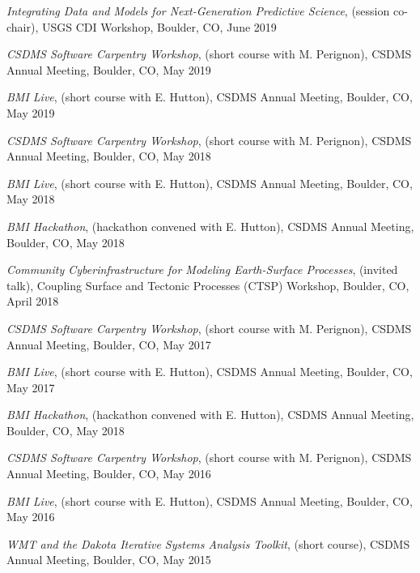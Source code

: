 \begin{enumerate}[{[}1{]}]
  \item \textit{Integrating Data and Models for Next-Generation
    Predictive Science}, (session co-chair), USGS CDI Workshop,
    Boulder, CO, June 2019

  \item \textit{CSDMS Software Carpentry Workshop}, (short course with
    M. Perignon), CSDMS Annual Meeting, Boulder, CO, May 2019

  \item \textit{BMI Live}, (short course with E. Hutton),
    CSDMS Annual Meeting, Boulder, CO, May 2019

  \item \textit{CSDMS Software Carpentry Workshop}, (short course with
    M. Perignon), CSDMS Annual Meeting, Boulder, CO, May 2018

  \item \textit{BMI Live}, (short course with E. Hutton),
    CSDMS Annual Meeting, Boulder, CO, May 2018

  \item \textit{BMI Hackathon}, (hackathon convened with E. Hutton),
    CSDMS Annual Meeting, Boulder, CO, May 2018

  \item \textit{Community Cyberinfrastructure for Modeling
    Earth-Surface Processes}, (invited talk), Coupling Surface and
    Tectonic Processes (CTSP) Workshop, Boulder, CO, April 2018

  \item \textit{CSDMS Software Carpentry Workshop}, (short course with
    M. Perignon), CSDMS Annual Meeting, Boulder, CO, May 2017

  \item \textit{BMI Live}, (short course with E. Hutton),
    CSDMS Annual Meeting, Boulder, CO, May 2017

  \item \textit{BMI Hackathon}, (hackathon convened with E. Hutton),
    CSDMS Annual Meeting, Boulder, CO, May 2018

  \item \textit{CSDMS Software Carpentry Workshop}, (short course with
    M. Perignon), CSDMS Annual Meeting, Boulder, CO, May 2016

  \item \textit{BMI Live}, (short course with E. Hutton),
    CSDMS Annual Meeting, Boulder, CO, May 2016

  \item \textit{WMT and the Dakota Iterative Systems Analysis Toolkit},
    (short course), CSDMS Annual Meeting, Boulder, CO, May 2015


\end{enumerate}
